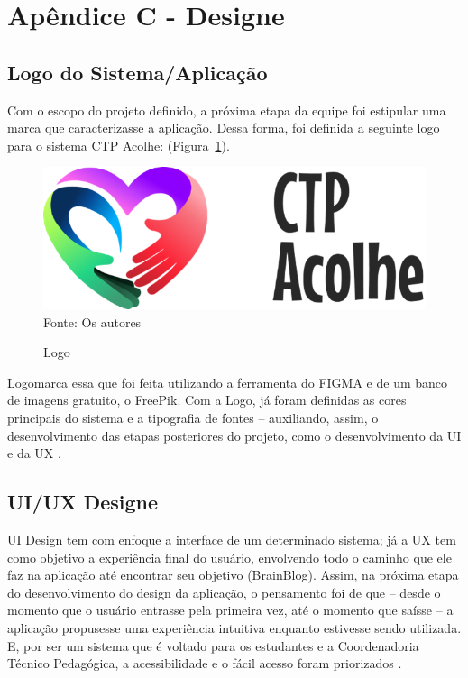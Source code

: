 \documentclass[12pt,a4paper]{article}
\begin{document}
\newpage

\section{Apêndice C - Designe}
\subsection{Logo do Sistema/Aplicação}
Com o escopo do projeto definido, a próxima etapa da equipe foi estipular uma marca que caracterizasse  a aplicação. 
Dessa forma, foi definida a seguinte logo para o sistema \gls{CTP Acolhe}: (Figura~\ref{ft01}).

\begin{figure}[H]
    \centering
    \caption{Logo}
     \includegraphics[width=12cm]{ft.png} \\
    Fonte: Os autores
    \label{ft01}
\end{figure}

Logomarca essa que foi feita utilizando a ferramenta do \gls{FIGMA} e de um banco de imagens gratuito, o \gls{FreePik}. Com a Logo, já foram definidas as cores principais do sistema e a tipografia de fontes – auxiliando, assim, o desenvolvimento das etapas posteriores do projeto, como o desenvolvimento da UI e da UX \cite{aela}.

\subsection{UI/UX Designe}
\ac{UI} Design tem com enfoque a interface de um determinado sistema; já a \ac{UX} tem como objetivo a experiência final do usuário, envolvendo todo o caminho que ele faz na aplicação até encontrar seu objetivo (BrainBlog).
Assim, na próxima etapa do desenvolvimento do design da aplicação, o pensamento foi de que – desde o momento que o usuário entrasse pela primeira vez, até o momento que saísse – a aplicação propusesse uma experiência intuitiva enquanto estivesse sendo utilizada. E, por ser um sistema que é voltado para os estudantes e a Coordenadoria Técnico Pedagógica, a acessibilidade e o fácil acesso foram priorizados \cite{aela}.
\end{document}
